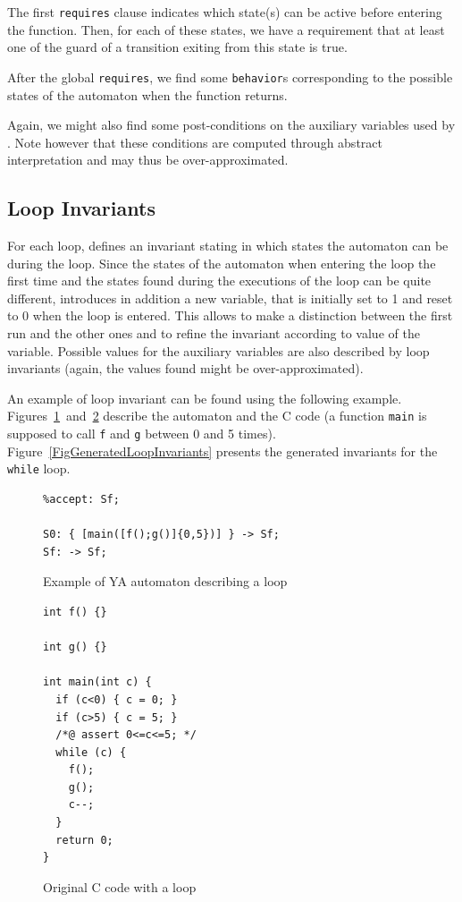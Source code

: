 \documentclass{frama-c-book}
\begin{document}
\lstset{style=c}
The first \lstinline|requires| clause indicates which state(s) can be active
before entering the function. Then, for each of these states, we have a
requirement that at least one of the guard of a transition exiting from this
state is true.

After the global \lstinline|requires|, we find some \lstinline|behavior|s
corresponding to the possible states of the automaton when the function
returns.

Again, we might also find some post-conditions on the auxiliary variables used
by \aorai. Note however that these conditions are computed through abstract
interpretation and may thus be over-approximated.

\subsection{Loop Invariants}
\label{SectGeneratedLoopInvariants}

For each loop, \aorai defines an invariant stating in which states the
automaton can be during the loop. Since the states of the automaton when
entering the loop the first time and the states found during the executions
of the loop can be quite different, \aorai introduces in addition a
new variable, that is initially set to 1 and reset to 0 when the loop is
entered. This allows to make a distinction between the first run and the other
ones and to refine the invariant according to value of the variable.
Possible values for the auxiliary variables are also described by loop
invariants (again, the values found might be over-approximated).

An example of loop invariant can be found using the following example.
Figures~\ref{fig:ya-loop}~and~\ref{fig:c-loop} describe the automaton and the
C code (a function \lstinline|main| is supposed to call \lstinline|f| and
\lstinline|g| between 0 and 5 times). Figure~\ref{FigGeneratedLoopInvariants}
presents the generated invariants for the \lstinline|while| loop.
\begin{figure}
\begin{lstlisting}[language=ya]
%init: S0;
%accept: Sf;

S0: { [main([f();g()]{0,5})] } -> Sf;
Sf: -> Sf;
\end{lstlisting}
\caption{Example of YA automaton describing a loop}
\label{fig:ya-loop}
\end{figure}

\begin{figure}[ht]
\begin{lstlisting}[style=c]
int f() {}

int g() {}

int main(int c) {
  if (c<0) { c = 0; }
  if (c>5) { c = 5; }
  /*@ assert 0<=c<=5; */
  while (c) {
    f();
    g();
    c--;
  }
  return 0;
}
\end{lstlisting}
\caption{Original C code with a loop}
\label{fig:c-loop}
\end{figure}
\end{document}
